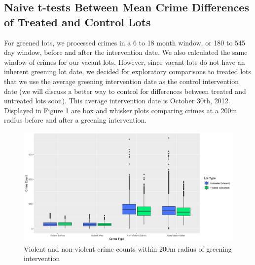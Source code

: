 \documentclass{article}
\begin{document}
\subsection{Naive t-tests Between Mean Crime Differences of Treated and Control Lots}
    For greened lots, we processed crimes in a 6 to 18 month window, or 180 to 545 day window, before and after the intervention date. We also calculated the same window of crimes for our vacant lots. However, since vacant lots do not have an inherent greening lot date, we decided for exploratory comparisons to treated lots that we use the average greening intervention date as the control intervention date (we will discuss a better way to control for differences between treated and untreated lots soon). This average intervention date is October 30th, 2012. Displayed in Figure \ref{fig:figure1} are box and whisker plots comparing crimes at a 200m radius before and after a greening intervention.
    \begin{figure}[h]
    \includegraphics[width=12cm]{imgs/chart_crimes_before_match_200.jpg}
    \centering
    \caption{Violent and non-violent crime counts within 200m radius of greening intervention}
    \label{fig:figure1}
    \end{figure}
    
\end{document}
